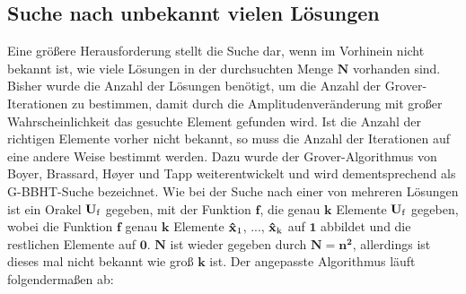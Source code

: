 \subsection{Suche nach unbekannt vielen Lösungen}
Eine größere Herausforderung stellt die Suche dar, wenn im Vorhinein nicht bekannt ist, wie viele Lösungen in der durchsuchten Menge $\mathbf{N}$ vorhanden sind. 
Bisher wurde die Anzahl der Lösungen benötigt, um die Anzahl der Grover-Iterationen zu bestimmen, damit durch die Amplitudenveränderung mit großer Wahrscheinlichkeit das gesuchte Element gefunden wird. 
Ist die Anzahl der richtigen Elemente vorher nicht bekannt, so muss die Anzahl der Iterationen auf eine andere Weise bestimmt werden. 
Dazu wurde der Grover-Algorithmus von Boyer, Brassard, Høyer und Tapp weiterentwickelt und wird dementsprechend als G-BBHT-Suche bezeichnet.
Wie bei der Suche nach einer von mehreren Lösungen ist ein Orakel $\mathbf{U \textsubscript{f}}$ gegeben, mit der Funktion $\mathbf{f}$, die genau $\mathbf{k}$ Elemente $\mathbf{U \textsubscript{f}}$ gegeben, wobei die Funktion $\mathbf{f}$ genau $\mathbf{k}$ Elemente $\mathbf{\hat x \textsubscript{1}}$, ..., $\mathbf{\hat x \textsubscript{k}}$ auf $\mathbf{1}$ abbildet und die restlichen Elemente auf $\mathbf{0}$. $\mathbf{N}$ ist wieder gegeben durch $\mathbf{N = n^2}$, allerdings ist dieses mal nicht bekannt wie groß $\mathbf{k}$ ist. Der angepasste Algorithmus läuft folgendermaßen ab:
